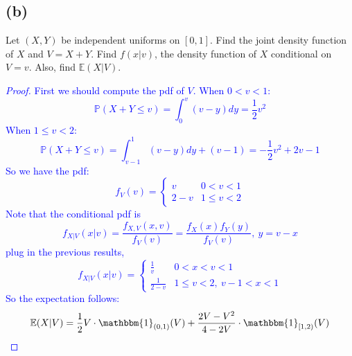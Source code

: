 \documentclass{article}
\begin{document}
\subsection*{(b)}
Let $(X,Y)$ be independent uniforms on $[0,1]$. Find the joint density function of $X$ and $V=X+Y$. Find $f(x|v)$, the density function of $X$ conditional on $V = v$. Also, find $\mathbb{E}(X|V)$. 
\textcolor{blue}{
\begin{proof}
    First we should compute the pdf of $V$. When $0<v<1$: 
    \begin{equation*}
        \mathbb{P}(X+Y\leq v) = \int_0^v(v-y)dy = \frac{1}{2}v^2
    \end{equation*}
    When $1 \leq v <2$:
    \begin{equation*}
        \mathbb{P}(X+Y\leq v) = \int_{v-1}^1(v-y)dy+(v-1) = -\frac{1}{2}v^2+2v-1
    \end{equation*}
    So we have the pdf:
    \begin{equation*}
        f_V(v) = 
        \begin{cases} 
          v & 0<v<1 \\
          2-v & 1\leq v <2 
       \end{cases}
    \end{equation*}
    Note that the conditional pdf is
    \begin{equation*}
        f_{X|V}(x|v) = \frac{f_{X,V}(x,v)}{f_V(v)} = \frac{f_X(x)f_Y(y)}{f_V(v)}, \  y=v-x
    \end{equation*}
    plug in the previous results,
    \begin{equation*}
        f_{X|V}(x|v) =
        \begin{cases}
          \frac{1}{v} & 0<x<v<1\\
          \frac{1}{2-v} & 1 \leq v <2, \  v-1< x < 1
        \end{cases}
    \end{equation*}
    So the expectation follows:
    \begin{equation*}
    \mathbb{E}(X|V) = \frac{1}{2} V \cdot \mathbbm{1}_{(0,1)}(V) + \frac{2V-V^2}{4-2V}\cdot \mathbbm{1}_{[1,2)}(V)
    \end{equation*}
\end{proof}
}
\end{document}
